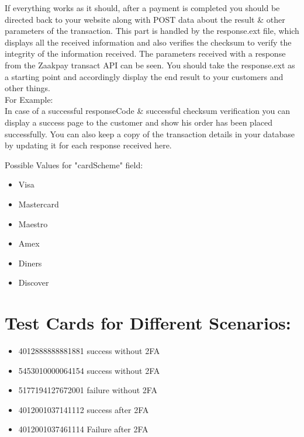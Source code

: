 \documentclass{article}
\begin{document}
If everything works as it should, after a payment is completed you   should be directed back to your website along with POST data about the result \& other parameters of the transaction. This part is handled   by the response.ext file, which displays all the received information and also verifies the checksum to verify the integrity of the information received. The parameters received with a response from the Zaakpay transact API can be seen. You should take the response.ext as a starting point and accordingly display the end result to your customers and other things.   \\
For Example: \\
In   case   of   a   successful   responseCode   \&   successful   checksum   verification   you   can   display   a   success   page  
to the customer and show his order has been placed successfully. You can also 
keep a copy of the transaction details in your database by updating it for each response received here.

Possible Values for "cardScheme" field: 
 \begin{itemize}
\item Visa 
\item Mastercard 
\item Maestro 
\item Amex 
\item Diners 
\item Discover
\end{itemize}

\section {Test Cards for Different Scenarios:}
\begin{itemize}
\item 4012888888881881 success without 2FA 
\item 5453010000064154 success without 2FA
\item 5177194127672001 failure without 2FA 
\item 4012001037141112 success after 2FA 
\item 4012001037461114 Failure after 2FA 
\end{itemize}

\newpage
\end{document}
